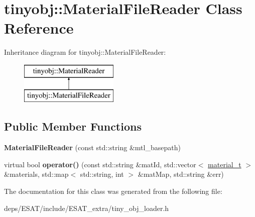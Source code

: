 \hypertarget{classtinyobj_1_1_material_file_reader}{}\section{tinyobj\+:\+:Material\+File\+Reader Class Reference}
\label{classtinyobj_1_1_material_file_reader}
Inheritance diagram for tinyobj\+:\+:Material\+File\+Reader\+:\begin{figure}[H]
\begin{center}
\leavevmode
\includegraphics[height=2.000000cm]{classtinyobj_1_1_material_file_reader}
\end{center}
\end{figure}
\subsection*{Public Member Functions}
\begin{DoxyCompactItemize}
\item 
\mbox{\label{classtinyobj_1_1_material_file_reader_a824d0100284310fe213d86ad443cc575}} 
{\bfseries Material\+File\+Reader} (const std\+::string \&mtl\+\_\+basepath)
\item 
\mbox{\label{classtinyobj_1_1_material_file_reader_a0b9f3231d766fe14d6a20ea645447a74}} 
virtual bool {\bfseries operator()} (const std\+::string \&mat\+Id, std\+::vector$<$ \mbox{\hyperlink{structtinyobj_1_1material__t}{material\+\_\+t}} $>$ \&materials, std\+::map$<$ std\+::string, int $>$ \&mat\+Map, std\+::string \&err)
\end{DoxyCompactItemize}


The documentation for this class was generated from the following file\+:\begin{DoxyCompactItemize}
\item 
deps/\+E\+S\+A\+T/include/\+E\+S\+A\+T\+\_\+extra/tiny\+\_\+obj\+\_\+loader.\+h\end{DoxyCompactItemize}
